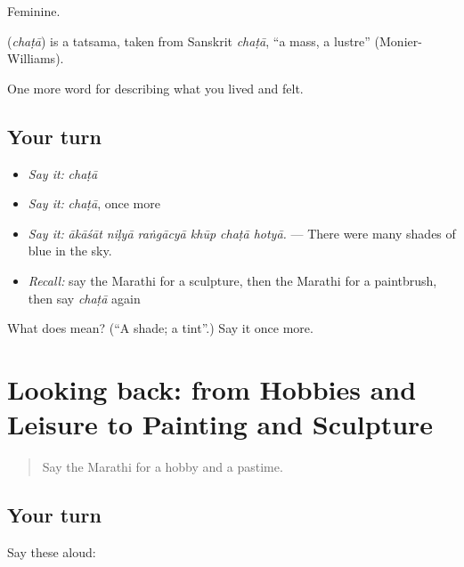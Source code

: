 Feminine.

\begin{cousinweb}
\textbf{} (\emph{chaṭā}) is a tatsama, taken from Sanskrit \emph{chaṭā}, \textquotedblleft{}a mass, a lustre\textquotedblright{} (Monier-Williams).
\end{cousinweb}

\begin{grammarlens}[title={What you've built}]
One more word for describing what you lived and felt.
\end{grammarlens}

\subsection*{Your turn}
\begin{itemize}
\raggedright
  \item \emph{Say it:} \emph{chaṭā}
  \item \emph{Say it:} \emph{chaṭā}, once more
  \item \emph{Say it:} \emph{ākāśāt niḷyā raṅgācyā khūp chaṭā hotyā.} — There were many shades of blue in the sky.
  \item \emph{Recall:} say the Marathi for a sculpture, then the Marathi for a paintbrush, then say \emph{chaṭā} again
\end{itemize}

\begin{tcolorbox}[breakable,colback=teal!4,colframe=teal!35!black,title={Before you move on}]
What does  mean? (\textquotedblleft{}A shade; a tint\textquotedblright{}.) Say it once more.
\end{tcolorbox}
\section[(dialogue)]{Looking back: from Hobbies and Leisure to Painting and Sculpture}

\label{lesson:MR-R535-review-528-535}



\begin{quote}
Say the Marathi for a hobby and a pastime.
\end{quote}

\subsection*{Your turn}
Say these aloud:

